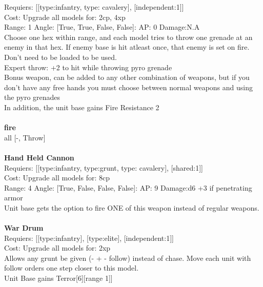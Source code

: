 Requiers: [[type:infantry, type: cavalery], [independent:1]] \\
Cost: Upgrade all models for: 2cp, 4xp \\


Range: 1  Angle: [True, True, False, False]: AP: 0 Damage:N.A \\
Choose one hex within range, and each model tries to throw one grenade at an enemy in that hex. If enemy base is hit atleast once, that enemy is set on fire.\\ 
Don't need to be loaded to be used.\\ 
Expert throw: +2 to hit while throwing pyro grenade\\ 
Bonus weapon, can be added to any other combination of weapons, but if you don't have any free hands you must choose between normal weapons and using the pyro grenades\\ 
In addition, the unit base gains Fire Resistance 2\\ 







\ \\ {\bf fire } \\
all [-, Throw] \\

\ \\
{\bf Hand Held Cannon } \\

Requiers: [[type:infantry, type:grunt, type: cavalery], [shared:1]] \\
Cost: Upgrade all models for: 8cp \\


Range: 4  Angle: [True, False, False, False]: AP: 9 Damage:d6 +3 if penetrating armor \\
Unit base gets the option to fire ONE of this weapon instead of regular weapons.\\ 








\ \\
{\bf War Drum } \\

Requiers: [[type:infantry], [type:elite], [independent:1]] \\
Cost: Upgrade all models for: 2xp \\
Allows any grunt be given (- + - follow) instead of chase. Move each unit with follow orders one step closer to this model.\\ 
Unit Base gains Terror[6][range 1]]\\ 









